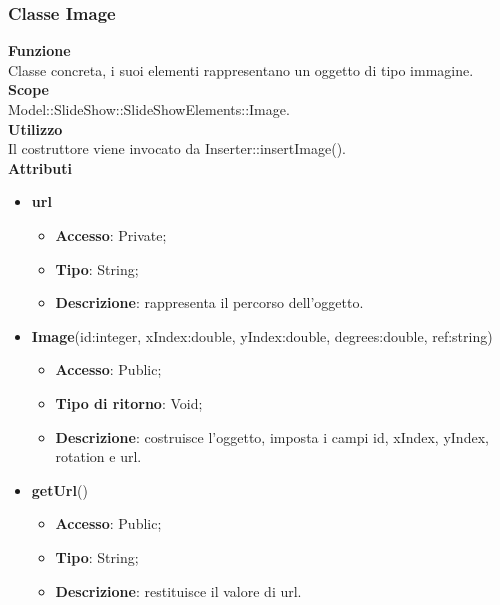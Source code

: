 {	\subsubsection{Classe Image}{
		\label{Image}
		\textbf{Funzione}\\
			\indent Classe concreta, i suoi elementi rappresentano un oggetto di tipo immagine.\\
	   	\textbf{Scope}\\
			\indent Model::SlideShow::SlideShowElements::Image.\\
		\textbf{Utilizzo}\\
			\indent Il costruttore viene invocato da Inserter::insertImage().\\
		\textbf{Attributi}
		\begin{itemize}
				\item \textbf{url}
				\begin{itemize}
					\item \textbf{Accesso}: Private;
					\item \textbf{Tipo}: String;
					\item \textbf{Descrizione}: rappresenta il percorso dell’oggetto.
				\end{itemize}
		\end{itemize}
		\begin{itemize}
			\item \textbf{Image}(id:integer, xIndex:double, yIndex:double, degrees:double, ref:string)
			\begin{itemize}
				\item \textbf{Accesso}: Public;
				\item \textbf{Tipo di ritorno}: Void;
				\item \textbf{Descrizione}: costruisce l’oggetto, imposta i campi id, xIndex, yIndex, rotation e url.
			\end{itemize}
			\item \textbf{getUrl}()
			\begin{itemize}
				\item \textbf{Accesso}: Public;
				\item \textbf{Tipo}: String;
				\item \textbf{Descrizione}: restituisce il valore di url.
			\end{itemize}
		\end{itemize}
		}
		
}
